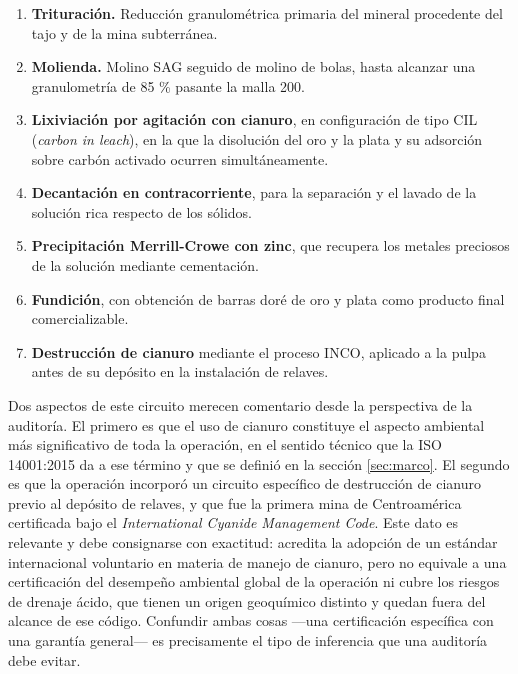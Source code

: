\begin{enumerate}
  \item \textbf{Trituración.} Reducción granulométrica primaria del mineral
        procedente del tajo y de la mina subterránea.
  \item \textbf{Molienda.} Molino SAG seguido de molino de bolas, hasta alcanzar
        una granulometría de 85 \% pasante la malla 200.
  \item \textbf{Lixiviación por agitación con cianuro}, en configuración de tipo
        CIL (\textit{carbon in leach}), en la que la disolución del oro y la plata
        y su adsorción sobre carbón activado ocurren simultáneamente.
  \item \textbf{Decantación en contracorriente}, para la separación y el lavado
        de la solución rica respecto de los sólidos.
  \item \textbf{Precipitación Merrill-Crowe con zinc}, que recupera los metales
        preciosos de la solución mediante cementación.
  \item \textbf{Fundición}, con obtención de barras doré de oro y plata como
        producto final comercializable.
  \item \textbf{Destrucción de cianuro} mediante el proceso INCO, aplicado a la
        pulpa antes de su depósito en la instalación de relaves.
\end{enumerate}

Dos aspectos de este circuito merecen comentario desde la perspectiva de la
auditoría. El primero es que el uso de cianuro constituye el aspecto ambiental
más significativo de toda la operación, en el sentido técnico que la
ISO 14001:2015 da a ese término y que se definió en la sección \ref{sec:marco}.
El segundo es que la operación incorporó un circuito específico de destrucción de
cianuro previo al depósito de relaves, y que fue la primera mina de Centroamérica
certificada bajo el \textit{International Cyanide Management Code}. Este dato es
relevante y debe consignarse con exactitud: acredita la adopción de un estándar
internacional voluntario en materia de manejo de cianuro, pero no equivale a una
certificación del desempeño ambiental global de la operación ni cubre los
riesgos de drenaje ácido, que tienen un origen geoquímico distinto y quedan fuera
del alcance de ese código. Confundir ambas cosas —una certificación específica
con una garantía general— es precisamente el tipo de inferencia que una auditoría
debe evitar.

